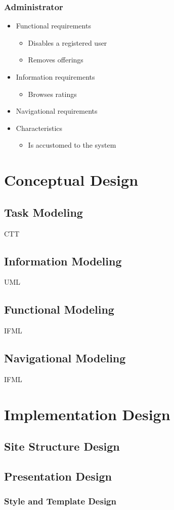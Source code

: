 \documentclass[a4paper]{report}
\begin{document}
\subsection{Administrator}
\begin{itemize}
	\item Functional requirements
	\begin{itemize}
		\item Disables a registered user
		\item Removes offerings
	\end{itemize}
	\item Information requirements
	\begin{itemize}
		\item Browses ratings
	\end{itemize}
	\item Navigational requirements
	\item Characteristics
	\begin{itemize}
		\item Is accustomed to the system
	\end{itemize}
\end{itemize}















\chapter{Conceptual Design}
\section{Task Modeling}
CTT

\section{Information Modeling}
UML

\section{Functional Modeling}
IFML

\section{Navigational Modeling}
IFML












\chapter{Implementation Design}
\section{Site Structure Design}
\section{Presentation Design}
\subsection{Style and Template Design}
\end{document}
